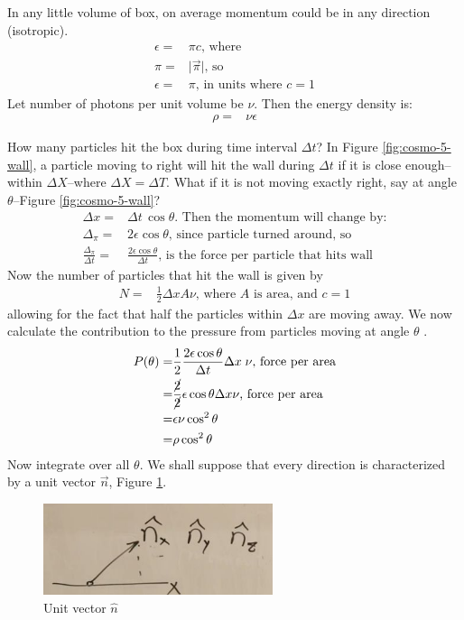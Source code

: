 \documentclass[]{article}
\begin{document}
In any little volume of box, on average momentum could be in any direction (isotropic).
\begin{align*}
	\epsilon =&  \pi c \text{, where }\\
	\pi=&\lvert\vec{\pi}\rvert \text{, so}\\
	\epsilon =& \pi \text{, in units where $c=1$}
\end{align*}
Let number of photons per unit volume be $\nu$. Then the energy density is:
\begin{align*}
	\rho =& \nu \epsilon 
\end{align*}

How many particles hit the box during time interval $\Delta t$? In Figure \ref{fig:cosmo-5-wall}, a particle moving to right will hit the wall during $\Delta t$ if it is close enough--within $\Delta X$--where $\Delta X=\Delta T$. What if it is not moving exactly right, say at angle $\theta$--Figure \ref{fig:cosmo-5-wall}?
\begin{align*}
	\Delta x =& \Delta t \, \cos{\theta} \text{. Then the momentum will change by:}\\
	\Delta_{\pi} =& 2 \epsilon \cos {\theta} \text{, since particle turned around, so}\\
	\frac{\Delta_{\pi}}{\Delta t} =& \frac{2 \epsilon \cos {\theta}}{\Delta t} \text{, is the force per particle that hits wall}
\end{align*}
Now the number of particles that hit the wall is given by
\begin{align*}
	N =& \frac{1}{2}\Delta x A \nu \text{, where $A$ is area, and $c=1$}
\end{align*}
allowing for the fact that half the particles within $\Delta x$ are moving away. We now calculate the contribution to the pressure from particles moving at angle $\theta$
.\begin{align*}
	P(\theta) =& \frac{1}{2} \frac{2 \epsilon \cos {\theta}}{\Delta t} \Delta x  \; \nu \text{, force per area}\\
	=& \frac{\cancel{2}}{\cancel{2}}  \epsilon \cos {\theta} \Delta x  \nu \text{, force per area}\\
	=&  \epsilon \nu \cos^2 {\theta}  \\ 
	=& \rho  \cos^2 {\theta} 
\end{align*}
Now integrate over all $\theta$. We shall suppose that every direction is characterized by a unit vector $\vec{n}$, Figure \ref{fig:cosmo-5-nxnynz}.

\begin{figure}[H]
	\caption{Unit vector $\hat{n}$}\label{fig:cosmo-5-nxnynz}
	\begin{center}
		\includegraphics[width=0.6\textwidth]{cosmo-5-nxnynz}
	\end{center}
\end{figure}
\end{document}
